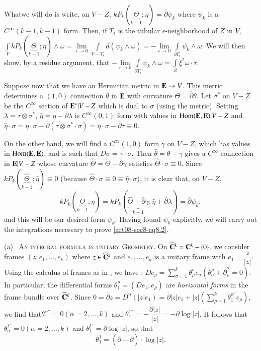 What\pageoriginale we will do is write, on $V-Z$, $kP_{k}(\underbrace{\Theta}_{k-1};\eta)=\overline{\partial}\psi_{k}$ where $\psi_{k}$ is a $C^{\infty}(k-1,k-1)$ form. Then, if $T_{\epsilon}$ is the tubular $\epsilon$-neighborhood of $Z$ in $V$, $\int\limits_{V}kP_{k}(\underbrace{\Theta}_{k-1};\eta)\wedge\omega=\lim\limits_{\epsilon\to 0}\int\limits_{V-T_{\epsilon}}d(\psi_{k}\wedge\omega)=-\lim\limits_{\epsilon\to 0}\int\limits_{\partial T_{\epsilon}}\psi_{k}\wedge \omega$. We will then show, by a residue argument, that $-\lim\limits_{\epsilon\to 0}\int\limits_{\partial T_{\epsilon}}\psi_{k}\wedge\omega=\int\limits_{Z}\xi^{*}\omega\cdot \tau$.

Suppose now that we have an Hermitian metric in $\mathbf{E}\to V$. This metric determines a $(1,0)$ connection $\theta$ in $\mathbf{E}$ with curvature $\Theta=\overline{\partial}\theta$. Let $\sigma^{*}$ on $V-Z$ be the $C^{\infty}$ section of $\mathbf{E}^{*}|V-Z$ which is dual to $\sigma$ (using the metric). Setting $\lambda=\tau\otimes \sigma^{*}$, $\widehat{\eta}=\eta-\overline{\partial}\lambda$ is $C^{\infty}(0,1)$ form with values in $\operatorname{\mathrm{Hom}}(\mathbf{E},\mathbf{E})|V-Z$ and $\widehat{\eta}\cdot \sigma=\eta\cdot \sigma-\overline{\partial}(\tau\otimes \sigma^{*}\cdot \sigma)=\eta\cdot \sigma-\overline{\partial}\tau\equiv 0$.

On the other hand, we will find a $C^{\infty}(1,0)$ form $\gamma$ on $V-Z$, which has values in $\operatorname{\mathrm{Hom}}(\mathbf{E},\mathbf{E})$, and is such that $D\sigma=\gamma\cdot \sigma$. Then $\widehat{\theta}=\theta-\gamma$ gives a $C^{\infty}$ connection in $\mathbf{E}|V-Z$ whose curvature $\widehat{\Theta}=\Theta-\overline{\partial}\gamma$ satisfies $\widehat{\Theta}\cdot \sigma\equiv 0$. Since $kP_{k}(\underbrace{\widehat{\Theta}}_{k-1};\widehat{\eta})\equiv 0$ (because $\widehat{\Theta}\cdot \sigma\equiv 0\equiv \widehat{\eta}\cdot \sigma)$, it is clear that, on $V-Z$,
$$
kP_{k}(\underbrace{\Theta}_{k-1};\eta)=kP_{k}(\underbrace{\widehat{\Theta}+\overline{\partial}\gamma}_{k-1};\widehat{\eta}+\overline{\partial}\lambda)=\overline{\partial}\psi_{k},
$$
and this will be our desired form $\psi_{k}$. Having found $\psi_{k}$ explicitly, we will carry out the integrations necessary to prove \eqref{art08-sec8-eq8.2}.

(a)~ \textsc{An integral formula in unitary Geometry.} On $\widehat{\mathbf{C}}^{k}=\mathbf{C}^{k}-\{0\}$, we consider frames $(z;e_{1},\ldots,e_{k})$ where $z\in \widehat{\mathbf{C}}^{k}$ and $e_{1},\ldots,e_{k}$ is a unitary frame with $e_{1}=\dfrac{z}{|z|}$. Using the calculus of frames as in \cite{art08-key5}, we have : $De_{\rho}=\sum\limits^{k}_{\sigma=1}\theta^{\sigma}_{\rho}e_{\sigma}(\theta^{\rho}_{\sigma}+\overline{\partial}^{\sigma}_{\rho}=0)$. In particular, the differential forms $\theta^{\rho}_{1}=(De_{1},e_{\rho})$ are {\em horizontal forms} in the frame bundle over $\widehat{\mathbf{C}}^{k}$. Since $0=\overline{\partial}z=D^{n}(|z|e_{1})=\overline{\partial}|z|e_{1}+|z|\left(\sum\limits^{k}_{\rho=1}\theta^{\rho''}_{1}e_{\rho}\right)$, we find that\pageoriginale $\theta^{\alpha''}_{1}=0(\alpha=2,\ldots,k)$ and $\theta^{1''}_{1}=-\dfrac{\overline{\partial}|z|}{|z|}=-\overline{\partial}\log |z|$. It follows that $\theta^{1'}_{\alpha}=0(\alpha=2,\ldots,k)$ and $\theta^{1'}_{1}=\partial \log |z|$, so that
$$
\theta^{1}_{1}=(\partial-\overline{\partial})\cdot \log |z|.
$$

